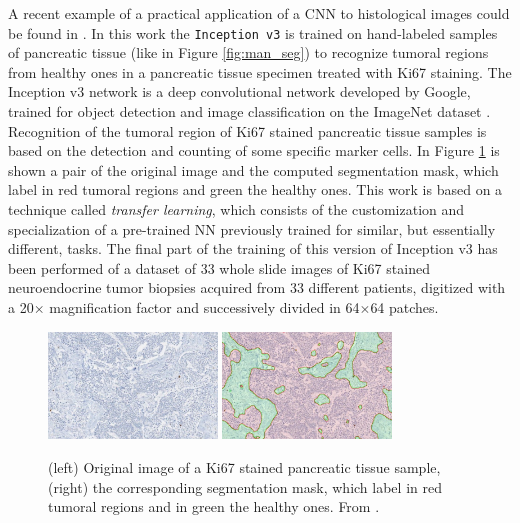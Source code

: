 A recent example of a practical application of a CNN to histological images could be found in \cite{Ki67}. In this work the \texttt{Inception v3} is trained on hand-labeled samples of pancreatic tissue (like in Figure \ref{fig:man_seg}) to recognize tumoral regions from healthy ones in a pancreatic tissue specimen treated with Ki67 staining. The Inception v3 \cite{ravindran2018classification} network is a deep convolutional network developed by Google, trained for object detection and image classification on the ImageNet dataset \cite{5206848}. Recognition of the tumoral region of Ki67 stained pancreatic tissue samples is based on the detection and counting of some specific marker cells. In Figure \ref{fig:autom_seg} is shown a pair of the original image and the computed segmentation mask, which label in red tumoral regions and green the healthy ones. This work is based on a technique called \textit{transfer learning}, which consists of the customization and specialization of a pre-trained NN previously trained for similar, but essentially different, tasks. The final part of the training of this version of Inception v3 has been performed of a dataset of 33 whole slide images of Ki67 stained neuroendocrine tumor biopsies acquired from 33 different patients, digitized with a 20$\times$ magnification factor and successively divided in 64$\times$64 patches.

    \begin{figure}
        \centering
        \includegraphics[width = 0.4\textwidth]{images/PancTissue}
        \includegraphics[width = 0.4\textwidth]{images/PancTissueSeg}
        \caption{(left) Original image of a Ki67 stained pancreatic tissue sample, (right) the corresponding segmentation mask, which label in red tumoral regions and in green the healthy ones. From \cite{Ki67}.}
        \label{fig:autom_seg}
    \end{figure}

